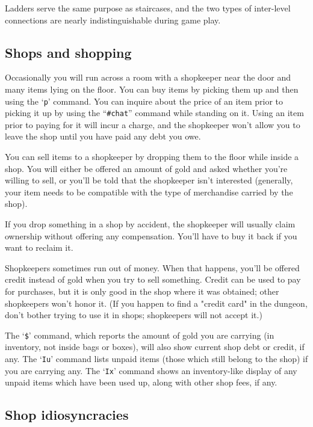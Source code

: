 
Ladders serve the same purpose as staircases, and the two types of
inter-level connections are nearly indistinguishable during game play.
\subsection*{Shops and shopping}


Occasionally you will run across a room with a shopkeeper near the door
and many items lying on the floor.  You can buy items by picking them
up and then using the `{\tt p}' command.  You can inquire about the price
of an item prior to picking it up by using the ``{\tt \#chat}'' command
while standing on it.  Using an item prior to paying for it will incur a
charge, and the shopkeeper won't allow you to leave the shop until you
have paid any debt you owe.

You can sell items to a shopkeeper by dropping them to the floor while
inside a shop.  You will either be offered an amount of gold and asked
whether you're willing to sell, or you'll be told that the shopkeeper
isn't interested (generally, your item needs to be compatible with the
type of merchandise carried by the shop).

If you drop something in a shop by accident, the shopkeeper will usually
claim ownership without offering any compensation.  You'll have to buy
it back if you want to reclaim it.

Shopkeepers sometimes run out of money.  When that happens, you'll be
offered credit instead of gold when you try to sell something.  Credit
can be used to pay for purchases, but it is only good in the shop where
it was obtained; other shopkeepers won't honor it.  (If you happen to
find a "credit card" in the dungeon, don't bother trying to use it in
shops; shopkeepers will not accept it.)

The `{\tt \$}' command, which reports the amount of gold you are carrying
(in inventory, not inside bags or boxes), will also show current shop
debt or credit, if any.  The `{\tt Iu}' command lists unpaid items
(those which still belong to the shop) if you are carrying any.
The `{\tt Ix}' command shows an inventory-like display of any unpaid
items which have been used up, along with other shop fees, if any.
\subsection*{Shop idiosyncracies}

